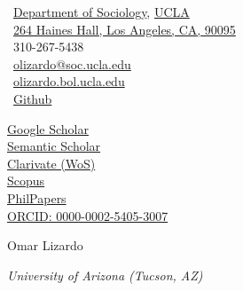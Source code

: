 \documentclass[10pt]{article}
\makeatletter
\def\myemail{olizardo@soc.ucla.edu}
\def\myweb{http://olizardo.bol.ucla.edu}
\def\myphone{310-267-5438}
\makeatother
\begin{document}
\begin{minipage}[t]{3.5in}
    \faUniversity \, \href{https://soc.ucla.edu}{Department of Sociology}, \href{https://ucla.edu}{UCLA} \\
    \faLocationArrow \, \href{https://goo.gl/maps/Ge1pAsh17ANWcdRB7}{264 Haines Hall, Los Angeles, CA, 90095} \\
    \faPhone \, \myphone  \\ 
    \faEnvelope \, \href{mailto:\myemail}{\myemail} \\
    \faGlobe \, \href{\myweb}{olizardo.bol.ucla.edu} \\
    \faGithub \, \href{https://github.com/olizardo}{Github}    
\end{minipage}
\begin{minipage}[t]{5in}
\vspace{-3.8mm}
    \href{https://scholar.google.com/citations?user=Lt5nMNkAAAAJ&hl=en}{Google Scholar} \\
    \href{https://www.semanticscholar.org/author/Omar-Lizardo/2632398}{Semantic Scholar} \\
    \href{https://www.webofscience.com/wos/author/record/477048}{Clarivate (WoS)} \\
    \href{https://www.scopus.com/authid/detail.uri?authorId=6508228764}{Scopus} \\
    \href{https://philpeople.org/profiles/omar-lizardo}{PhilPapers} \\
    \href{https://orcid.org/0000-0002-5405-3007}{ORCID: 0000-0002-5405-3007} 
\end{minipage}
\vspace{10mm}
\newcommand{\myname}{ \noindent}
\begin{center}
    {\myname  Omar Lizardo}
\end{center}

\reversemarginpar
\bigskip
\bigskip
\noindent\emph{University of Arizona (Tucson, AZ) \vspace{0.01in}}
\end{document}
